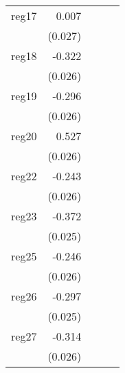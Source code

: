 {\begin{longtable}{l*{4}{D{.}{.}{-1}}}
\addlinespace
reg17       &       0.007         &                     &                     &                     \\
            &     (0.027)         &                     &                     &                     \\
\addlinespace
reg18       &      -0.322\sym{***}&                     &                     &                     \\
            &     (0.026)         &                     &                     &                     \\
\addlinespace
reg19       &      -0.296\sym{***}&                     &                     &                     \\
            &     (0.026)         &                     &                     &                     \\
\addlinespace
reg20       &       0.527\sym{***}&                     &                     &                     \\
            &     (0.026)         &                     &                     &                     \\
\addlinespace
reg22       &      -0.243\sym{***}&                     &                     &                     \\
            &     (0.026)         &                     &                     &                     \\
\addlinespace
reg23       &      -0.372\sym{***}&                     &                     &                     \\
            &     (0.025)         &                     &                     &                     \\
\addlinespace
reg25       &      -0.246\sym{***}&                     &                     &                     \\
            &     (0.026)         &                     &                     &                     \\
\addlinespace
reg26       &      -0.297\sym{***}&                     &                     &                     \\
            &     (0.025)         &                     &                     &                     \\
\addlinespace
reg27       &      -0.314\sym{***}&                     &                     &                     \\
            &     (0.026)         &                     &                     &                     \\

\end{longtable}}
